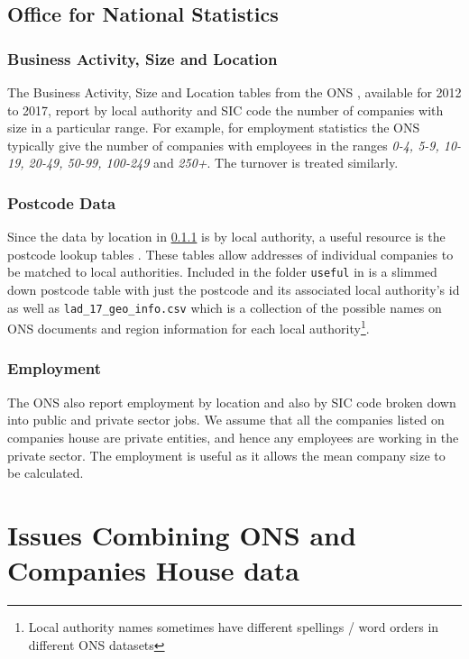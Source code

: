 \documentclass[a4paper,10pt]{article}
\begin{document}
   \subsection{Office for National Statistics}
   \subsubsection{Business Activity, Size and Location}
   \label{basl}
   The Business Activity, Size and Location tables from the ONS \cite{basl}, available for 2012 to 2017, report by local authority and SIC code the number of companies with size in a particular range. For example, for employment statistics the ONS typically give the number of companies with employees in the ranges \emph{0-4, 5-9, 10-19, 20-49, 50-99, 100-249} and \emph{250+}. The turnover is treated similarly.
   
   \subsubsection{Postcode Data}

   Since the data by location in \ref{basl} is by local authority, a useful resource is the postcode lookup tables \cite{postcodes}. These tables allow addresses of individual companies to be matched to local authorities. Included in the folder \texttt{useful} in \cite{github} is a slimmed down postcode table with just the postcode and its associated local authority's id as well as \texttt{lad\_17\_geo\_info.csv} which is a collection of the possible names on ONS documents and region information for each local authority\footnote{Local authority names sometimes have different spellings / word orders in different ONS datasets}.

   \subsubsection{Employment}

   The ONS also report employment \cite{employment} by location and also by SIC code broken down into public and private sector jobs. We assume that all the companies listed on companies house are private entities, and hence any employees are working in the private sector. The employment is useful as it allows the mean company size to be calculated.

   \section{Issues Combining ONS and Companies House data}
\end{document}

